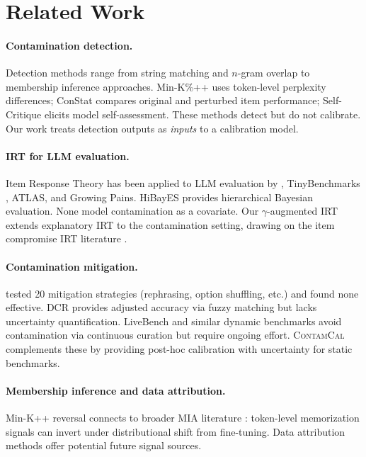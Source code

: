 \documentclass[11pt,a4paper]{article}
\newcommand{\contamcal}{\textsc{ContamCal}}
\begin{document}
\section{Related Work}
\label{sec:related}

\paragraph{Contamination detection.}
Detection methods range from string matching and $n$-gram overlap \cite{dodge2021documenting} to membership inference approaches. Min-K\%++ \cite{shi2024detecting} uses token-level perplexity differences; ConStat \cite{dekoninck2024constat} compares original and perturbed item performance; Self-Critique elicits model self-assessment. These methods detect but do not calibrate. Our work treats detection outputs as \emph{inputs} to a calibration model.

\paragraph{IRT for LLM evaluation.}
Item Response Theory has been applied to LLM evaluation by \citet{lalor2024aaai}, TinyBenchmarks \cite{polo2024tinybenchmarks}, ATLAS, and Growing Pains. HiBayES provides hierarchical Bayesian evaluation. None model contamination as a covariate. Our $\gamma$-augmented IRT extends explanatory IRT \cite{deboeck2004explanatory} to the contamination setting, drawing on the item compromise IRT literature \cite{eckerly2017detecting,sinharay2017detection}.

\paragraph{Contamination mitigation.}
\citet{xu2025emperor} tested 20 mitigation strategies (rephrasing, option shuffling, etc.) and found none effective. DCR \cite{oren2024dcr} provides adjusted accuracy via fuzzy matching but lacks uncertainty quantification. LiveBench and similar dynamic benchmarks \cite{white2024livebench} avoid contamination via continuous curation but require ongoing effort. \contamcal{} complements these by providing post-hoc calibration with uncertainty for static benchmarks.

\paragraph{Membership inference and data attribution.}
Min-K++ reversal connects to broader MIA literature \cite{shokri2017membership,carlini2022extracting}: token-level memorization signals can invert under distributional shift from fine-tuning. Data attribution methods \cite{pruthi2020tracin,park2023trak} offer potential future signal sources.
\end{document}
